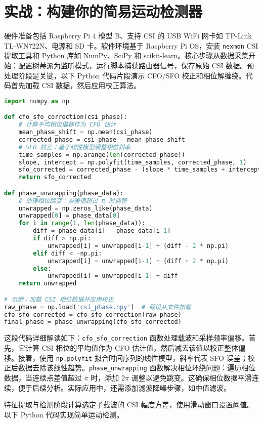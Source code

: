 \chapter{实战：构建你的简易运动检测器}
硬件准备包括 Raspberry Pi 4 模型 B、支持 CSI 的 USB WiFi 网卡如 TP-Link TL-WN722N、电源和 SD 卡。软件环境基于 Raspberry Pi OS，安装 \texttt{nexmon} CSI 提取工具和 Python 库如 NumPy、SciPy 和 scikit-learn。核心步骤从数据采集开始：配置树莓派为监听模式，运行脚本捕获路由器信号，保存原始 CSI 数据。预处理阶段是关键，以下 Python 代码片段演示 CFO/SFO 校正和相位解缠绕。代码首先加载 CSI 数据，然后应用校正算法。\par
\begin{lstlisting}[language=python]
import numpy as np

def cfo_sfo_correction(csi_phase):
    # 计算平均相位偏移作为 CFO 估计
    mean_phase_shift = np.mean(csi_phase)
    corrected_phase = csi_phase - mean_phase_shift
    # SFO 校正：基于线性模型调整相位斜率
    time_samples = np.arange(len(corrected_phase))
    slope, intercept = np.polyfit(time_samples, corrected_phase, 1)
    sfo_corrected = corrected_phase - (slope * time_samples + intercept)
    return sfo_corrected

def phase_unwrapping(phase_data):
    # 处理相位跳变：当差值超过 π 时调整
    unwrapped = np.zeros_like(phase_data)
    unwrapped[0] = phase_data[0]
    for i in range(1, len(phase_data)):
        diff = phase_data[i] - phase_data[i-1]
        if diff > np.pi:
            unwrapped[i] = unwrapped[i-1] + (diff - 2 * np.pi)
        elif diff < -np.pi:
            unwrapped[i] = unwrapped[i-1] + (diff + 2 * np.pi)
        else:
            unwrapped[i] = unwrapped[i-1] + diff
    return unwrapped

# 示例：加载 CSI 相位数据并应用校正
raw_phase = np.load('csi_phase.npy')  # 假设从文件加载
cfo_sfo_corrected = cfo_sfo_correction(raw_phase)
final_phase = phase_unwrapping(cfo_sfo_corrected)
\end{lstlisting}
这段代码详细解读如下：\texttt{cfo\_{}sfo\_{}correction} 函数处理载波和采样频率偏移。首先，它计算 CSI 相位的平均值作为 CFO 估计值，然后减去该值以校正整体偏移。接着，使用 \texttt{np.polyfit} 拟合时间序列的线性模型，斜率代表 SFO 误差；校正后数据去除该线性趋势。\texttt{phase\_{}unwrapping} 函数解决相位环绕问题：遍历相位数据，当连续点差值超过 $\pi$ 时，添加 $2\pi$ 调整以避免跳变。这确保相位数据平滑连续，便于后续分析。实际应用中，还需添加滤波降噪步骤，如中值滤波。\par
特征提取与检测阶段计算选定子载波的 CSI 幅度方差，使用滑动窗口设置阈值。以下 Python 代码实现简单运动检测。\par
